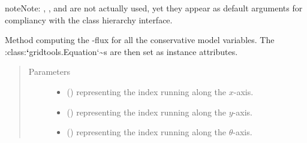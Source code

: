\documentclass[letterpaper,10pt,english]{sphinxmanual}
\begin{document}
\begin{fulllineitems}
\begin{fulllineitems}
\begin{quote}
\begin{description}
\begin{itemize}
\end{itemize}

\end{description}\end{quote}

\begin{sphinxadmonition}{note}{Note:}
, , and  are not actually used, yet they appear
as default arguments for compliancy with the class hierarchy interface.
\end{sphinxadmonition}

\end{fulllineitems}


\begin{fulllineitems}
\label{\detokenize{api:dycore.flux_isentropic_centered.FluxIsentropicCentered._compute_vertical_fluxes}}
Method computing the -flux
for all the conservative model variables.
The :class:{\color{red}\bfseries{}{}`}gridtools.Equation{}`\textasciitilde{}s are then set as instance attributes.
\begin{quote}\begin{description}
\item[{Parameters}] \leavevmode\begin{itemize}
\item {} 
 () \textendash{}  representing the index running along the \(x\)-axis.

\item {} 
 () \textendash{}  representing the index running along the \(y\)-axis.

\item {} 
 () \textendash{}  representing the index running along the \(\theta\)-axis.


\end{itemize}
\end{description}
\end{quote}
\end{fulllineitems}
\end{fulllineitems}
\end{document}
